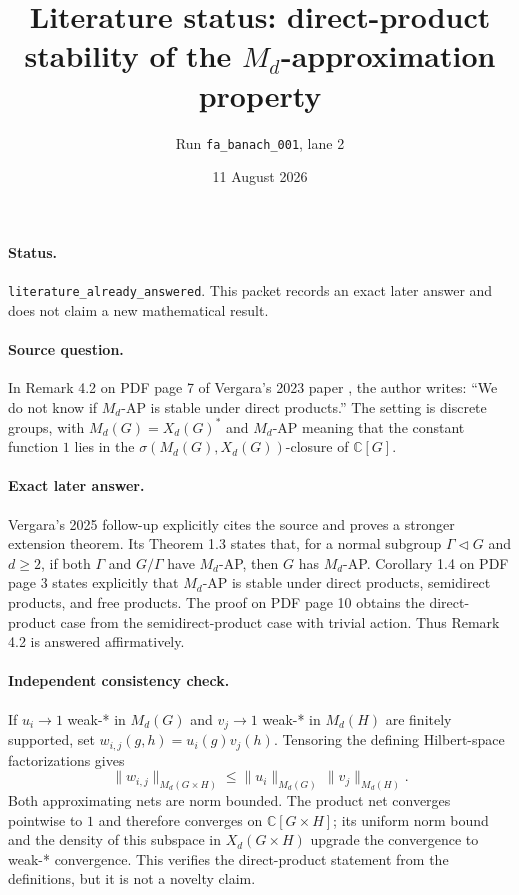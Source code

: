 \documentclass[11pt]{article}
\title{Literature status: direct-product stability of the $M_d$-approximation property}
\author{Run \texttt{fa\_banach\_001}, lane 2}
\date{11 August 2026}
\begin{document}
\maketitle

\paragraph{Status.}
\texttt{literature\_already\_answered}. This packet records an exact later
answer and does not claim a new mathematical result.

\paragraph{Source question.}
In Remark 4.2 on PDF page 7 of Vergara's 2023 paper
\cite{Vergara2023}, the author writes: ``We do not know if $M_d$-AP is
stable under direct products.'' The setting is discrete groups, with
$M_d(G)=X_d(G)^*$ and $M_d$-AP meaning that the constant function $1$ lies
in the $\sigma(M_d(G),X_d(G))$-closure of $\mathbb C[G]$.

\paragraph{Exact later answer.}
Vergara's 2025 follow-up \cite{Vergara2025} explicitly cites the source and
proves a stronger extension theorem. Its Theorem 1.3 states that, for a
normal subgroup $\Gamma\triangleleft G$ and $d\geq2$, if both $\Gamma$ and
$G/\Gamma$ have $M_d$-AP, then $G$ has $M_d$-AP. Corollary 1.4 on PDF page
3 states explicitly that $M_d$-AP is stable under direct products,
semidirect products, and free products. The proof on PDF page 10 obtains the
direct-product case from the semidirect-product case with trivial action.
Thus Remark 4.2 is answered affirmatively.

\paragraph{Independent consistency check.}
If $u_i\to1$ weak-* in $M_d(G)$ and $v_j\to1$ weak-* in $M_d(H)$ are
finitely supported, set $w_{i,j}(g,h)=u_i(g)v_j(h)$. Tensoring the defining
Hilbert-space factorizations gives
\[
 \|w_{i,j}\|_{M_d(G\times H)}
 \leq \|u_i\|_{M_d(G)}\,\|v_j\|_{M_d(H)}.
\]
Both approximating nets are norm bounded. The product net converges pointwise
to $1$ and therefore converges on $\mathbb C[G\times H]$; its uniform norm
bound and the density of this subspace in $X_d(G\times H)$ upgrade the
convergence to weak-* convergence. This verifies the direct-product statement
from the definitions, but it is not a novelty claim.
\end{document}
